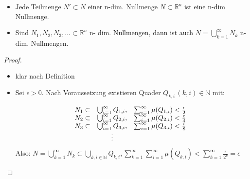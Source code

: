 \begin{proposition}\leavevmode
\begin{itemize}
	\item Jede Teilmenge $N' \subset N$ einer n-dim. Nullmenge $N \subset \mathbb{R}^n$ ist eine n-dim Nullmenge.
	\item Sind $N_1, N_2, N_3, ... \subset \mathbb{R}^n$ n- dim. Nullmengen, dann ist auch $N = \bigcup_{k=1}^\infty N_k$ n-dim. Nullmengen.
\end{itemize}
\end{proposition}
\begin{proof}\leavevmode
\begin{itemize}
	\item klar nach Definition
	\item Sei $\epsilon > 0$. Nach Voraussetzung existieren Quader $Q_{k,i} \, (k,i) \in \mathbb{N}$ mit:
	
	\begin{equation*}
		\begin{matrix}
		N_1 \subset & \bigcup_{i =1}^{\infty} Q_{1,i}, & \sum_{i=1}^{\infty} \mu(Q_{1,i}) < \frac{\epsilon}{2}\\
		N_2 \subset & \bigcup_{i =1}^{\infty} Q_{2,i}, & \sum_{i=1}^{\infty} \mu(Q_{2,i}) < \frac{\epsilon}{4}\\
		N_3 \subset & \bigcup_{i =1}^{\infty} Q_{3,i}, & \sum_{i=1}^{\infty} \mu(Q_{3,i}) < \frac{\epsilon}{8}\\
		& \vdots
		\end{matrix}\\
	\end{equation*}	
	Also: $N = \bigcup_{k=1}^{\infty} N_k \subset \bigcup_{k,i \in \mathbb{N}} Q_{k,i}, \sum_{k=1}^{\infty}\sum_{i=1}^{\infty} \mu(Q_{k,i}) < \sum_{k=1}^{\infty} \frac{\epsilon}{2^k} = \epsilon$
\end{itemize}

\end{proof}
